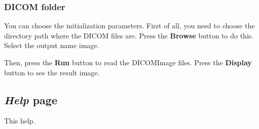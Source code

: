 \documentclass{article}
\begin{document}
\subsubsection{DICOM folder}
You can choose the initialization parameters.
First of all, you need to choose the directory path where the DICOM files are. Press the {\bf Browse} button to do this.
Select the output name image.

Then, press the {\bf Run} button to read the DICOMImage files.
Press the {\bf Display} button to see the result image.

\subsection{\emph{Help} page}
This help.
\end{document}
